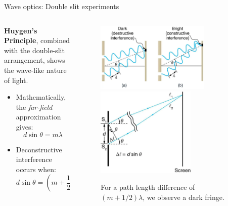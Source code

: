 \documentclass{beamer}
\begin{document}
\begin{frame}{Wave optics: Double slit experiments}
\begin{columns}[T]
\begin{column}{0.5\textwidth}
\small
\textbf{\alert{Huygen's Principle}}, combined with the double-slit arrangement, shows the wave-like nature of light.
\begin{itemize}
    \item Mathematically, the \textit{far-field} approximation gives:
    \begin{equation}
        d\sin\theta = m\lambda
    \end{equation}
    \item Deconstructive interference occurs when:
    \begin{equation}
        d\sin\theta = \left(m + \frac{1}{2}\right)\lambda
    \end{equation}
\end{itemize}
\end{column}
\begin{column}{0.5\textwidth}
\footnotesize
\begin{figure}
\centering
\includegraphics[width=0.75\textwidth]{figures/slit4.png}
\includegraphics[width=0.65\textwidth]{figures/slit5.png}
\caption{\label{fig:slit4} \footnotesize For a path length difference of $(m+1/2)\lambda$, we observe a dark fringe.}
\end{figure}
\end{column}
\end{columns}
\end{frame}
\end{document}
